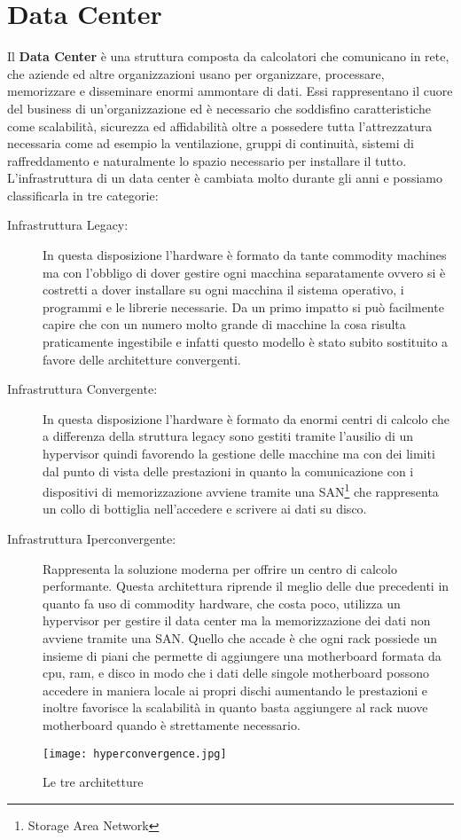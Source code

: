 \section{Data Center}
Il \textbf{Data Center} è una struttura composta da calcolatori che comunicano in rete, che aziende ed altre organizzazioni usano per organizzare, processare, memorizzare e disseminare enormi ammontare di dati. Essi rappresentano il cuore del business di un'organizzazione ed è necessario che soddisfino caratteristiche come scalabilità, sicurezza ed affidabilità oltre a possedere tutta l'attrezzatura necessaria come ad esempio la ventilazione, gruppi di continuità, sistemi di raffreddamento e naturalmente lo spazio necessario per installare il tutto. L'infrastruttura di un data center è cambiata molto durante gli anni e possiamo classificarla in tre categorie: 
\begin{description}
  \item[Infrastruttura Legacy:] In questa disposizione l'hardware è formato da tante commodity machines ma con l'obbligo di dover gestire ogni macchina separatamente ovvero si è costretti a dover installare su ogni macchina il sistema operativo, i programmi e le librerie necessarie. Da un primo impatto si può facilmente capire che con un numero molto grande di macchine la cosa risulta praticamente ingestibile e infatti questo modello è stato subito sostituito a favore delle architetture convergenti.
  \item[Infrastruttura Convergente:] In questa disposizione l'hardware è formato da enormi centri di calcolo che a differenza della struttura legacy sono gestiti tramite l'ausilio di un hypervisor quindi favorendo la gestione delle macchine ma con dei limiti dal punto di vista delle prestazioni in quanto la comunicazione con i dispositivi di memorizzazione avviene tramite una SAN\footnote{Storage Area Network} che rappresenta un collo di bottiglia nell'accedere e scrivere ai dati su disco.
  \item[Infrastruttura Iperconvergente:] Rappresenta la soluzione moderna per offrire un centro di calcolo performante. Questa architettura riprende il meglio delle due precedenti in quanto fa uso di commodity hardware, che costa poco, utilizza un hypervisor per gestire il data center ma la memorizzazione dei dati non avviene tramite una SAN. Quello che accade è che ogni rack possiede un insieme di piani che permette di aggiungere una motherboard formata da cpu, ram, e disco in modo che i dati delle singole motherboard possono accedere in maniera locale ai propri dischi aumentando le prestazioni e inoltre favorisce la scalabilità in quanto basta aggiungere al rack nuove motherboard quando è strettamente necessario.  
\end{description}
\begin{figure}[ht]
  \begin{center}
    \texttt{[image: hyperconvergence.jpg]}
    \caption{Le tre architetture}
    \label{hyp}
  \end{center}
\end{figure}
